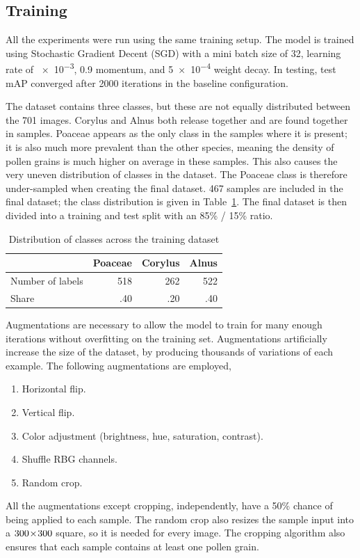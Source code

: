 \subsection{Training}
All the experiments were run using the same training setup.
The model is trained using Stochastic Gradient Decent (SGD) with a mini batch size of 32, learning rate of \num{e-3}, \num{0.9} momentum, and \num{5e-4} weight decay.
In testing, test mAP converged after 2000 iterations in the baseline configuration.

The dataset contains three classes, but these are not equally distributed between the 701 images.
Corylus and Alnus both release together and are found together in samples.
Poaceae appears as the only class in the samples where it is present; it is also much more prevalent than the other species, meaning the density of pollen grains is much higher on average in these samples.
This also causes the very uneven distribution of classes in the dataset.
The Poaceae class is therefore under-sampled when creating the final dataset.
467 samples are included in the final dataset; the class distribution is given in Table~\ref{tab:training-dataset}.
The final dataset is then divided into a training and test split with an 85\% / 15\% ratio.

\begin{table}[htbp]
  \caption[Class distribution across the final training dataset containing 467 sample images.]{Distribution of classes across the training dataset}\label{tab:training-dataset}
  \centering
  \begin{tabular}{lrrr} \toprule
                      & Poaceae & Corylus & Alnus \\ \midrule
    Number of labels  & 518    & 262     & 522 \\
    Share             & .40  & .20  & .40 \\ \bottomrule
  \end{tabular}
\end{table}

Augmentations are necessary to allow the model to train for many enough iterations without overfitting on the training set.
Augmentations artificially increase the size of the dataset, by producing thousands of variations of each example.
The following augmentations are employed,
%
\begin{enumerate}
  \item Horizontal flip.
  \item Vertical flip.
  \item Color adjustment (brightness, hue, saturation, contrast).
  \item Shuffle RBG channels.
  \item Random crop.
\end{enumerate}
%
All the augmentations except cropping, independently, have a 50\% chance of being applied to each sample.
The random crop also resizes the sample input into a \(300\!\times \! 300\) square, so it is needed for every image.
The cropping algorithm also ensures that each sample contains at least one pollen grain.

